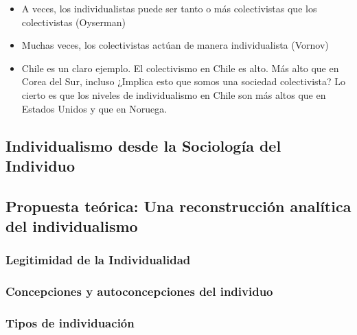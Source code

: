 \documentclass[12pt,twoside]{templates/facsothesis}
\providecommand{\tightlist}{%
  \setlength{\itemsep}{0pt}\setlength{\parskip}{0pt}}
\begin{document}
\begin{itemize}
\begin{itemize}
\begin{itemize}
      \begin{itemize}
      \tightlist
      \item
        A veces, los individualistas puede ser tanto o más colectivistas que los colectivistas (Oyserman)
      \item
        Muchas veces, los colectivistas actúan de manera individualista (Vornov)
      \item
        Chile es un claro ejemplo. El colectivismo en Chile es alto. Más alto que en Corea del Sur, incluso ¿Implica esto que somos una sociedad colectivista? Lo cierto es que los niveles de individualismo en Chile son más altos que en Estados Unidos y que en Noruega.
      \end{itemize}
    \end{itemize}
  \end{itemize}
\end{itemize}

\hypertarget{individualismo-desde-la-sociologuxeda-del-individuo}{%
\subsection{Individualismo desde la Sociología del Individuo}\label{individualismo-desde-la-sociologuxeda-del-individuo}}

\hypertarget{propuesta-teuxf3rica-una-reconstrucciuxf3n-analuxedtica-del-individualismo}{%
\subsection{Propuesta teórica: Una reconstrucción analítica del individualismo}\label{propuesta-teuxf3rica-una-reconstrucciuxf3n-analuxedtica-del-individualismo}}

\hypertarget{legitimidad-de-la-individualidad}{%
\subsubsection{Legitimidad de la Individualidad}\label{legitimidad-de-la-individualidad}}

\hypertarget{concepciones-y-autoconcepciones-del-individuo}{%
\subsubsection{Concepciones y autoconcepciones del individuo}\label{concepciones-y-autoconcepciones-del-individuo}}

\hypertarget{tipos-de-individuaciuxf3n}{%
\subsubsection{Tipos de individuación}\label{tipos-de-individuaciuxf3n}}
\end{document}
